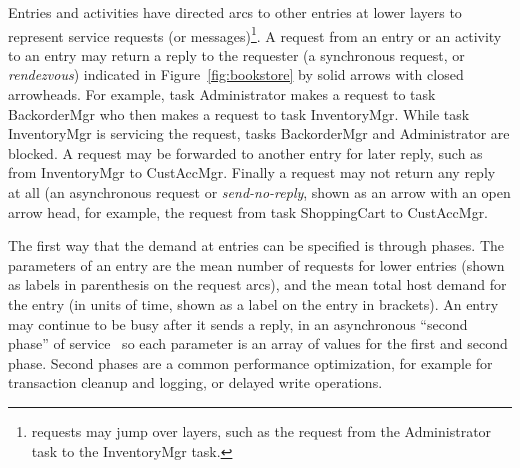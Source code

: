 Entries and activities have directed arcs to other entries
at lower layers to represent service
requests (or
messages)\footnote{requests may jump over
  layers, such as the request from the
  Administrator task to the InventoryMgr task.}. A request from an
entry or an activity to an entry may return a
reply to the requester (a
synchronous request, or
\emph{rendezvous}) indicated in
Figure~\ref{fig:bookstore} by solid arrows with closed arrowheads.
For example, task Administrator makes a request to task BackorderMgr
who then makes a request to task InventoryMgr. While task InventoryMgr
is servicing the request, tasks BackorderMgr and Administrator are
blocked.  A request may be
forwarded to another entry
for later reply, such as from InventoryMgr to CustAccMgr.  Finally a
request may not return any reply at all (an asynchronous
request or
\emph{send-no-reply}, shown as an arrow with an
open arrow head, for example, the request from task ShoppingCart to
CustAccMgr.

The first way that the demand at entries can be specified is through
phases.  The parameters of an
entry are the mean number of requests for
lower entries (shown as labels in parenthesis on the request arcs),
and the mean total host demand for the entry (in units of time, shown
as a label on the entry in brackets). An entry may continue to be busy
after it sends a reply, in an asynchronous ``second
phase'' of
service~\cite{perf:franks-99b} so each parameter is an array of values
for the first and second phase.  Second phases are a common
performance optimization, for example for transaction cleanup and
logging, or delayed write operations.

